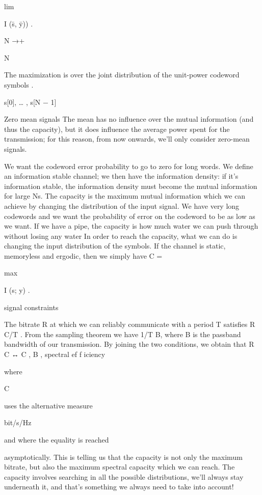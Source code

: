 {lim

I (s̄, ȳ)) .

N →+\infty

N

The maximization is over the joint distribution of the unit-power codeword symbols
.

s[0], … , s[N − 1]

Zero mean signals The mean has no influence over the mutual information (and thus the capacity), but it does influence the average power spent for the transmission; for this reason, from now onwards, we'll only consider zero-mean signals.

We want the codeword error probability to go to zero for long words.
We define an information stable channel; we then have the information density: if it's information stable, the information density must become the mutual information for large Ns.
The capacity is the maximum mutual information which we can achieve by changing the distribution of the input signal.
We have very long codewords and we want the probability of error on the codeword to be as low as we want.
If we have a pipe, the capacity is how much water we can push through without losing any water In order to reach the capacity, what we can do is changing the input distribution of the symbols.
If the channel is static, memoryless and ergodic, then we simply have C =

max

I (s; y) .

signal constraints

The bitrate R at which we can reliably communicate with a period T satisfies R \leq C/T .
From the sampling theorem we have 1/T \leq B, where B is the passband bandwidth of our transmission. By joining the two conditions, we obtain that R
\leq C ↔ \nu \leq C ,
B
\nu, spectral ef f iciency

where

C

uses the alternative measure

bit/s/Hz

and where the equality is reached

asymptotically.
This is telling us that the capacity is not only the maximum bitrate, but also the maximum spectral capacity which we can reach.
The capacity involves searching in all the possible distributions, we'll always stay underneath it, and that's something we always need to take into account!

}
